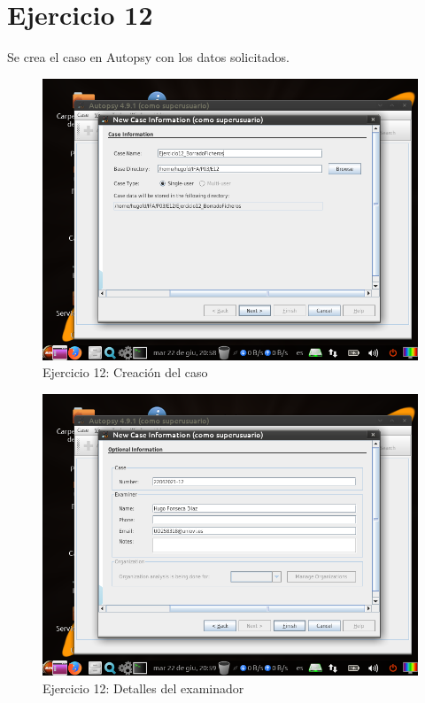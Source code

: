 \documentclass[11pt]{article}
\begin{document}
\section{Ejercicio 12}
Se crea el caso en Autopsy con los datos solicitados.

\begin{figure}[H]
    \caption{Ejercicio 12: Creación del caso}
    \centering
    \includegraphics[scale=0.7]{e12-1.png}
\end{figure}

\begin{figure}[H]
    \caption{Ejercicio 12: Detalles del examinador}
    \centering
    \includegraphics[scale=0.7]{e12-2.png}
\end{figure}
\end{document}

